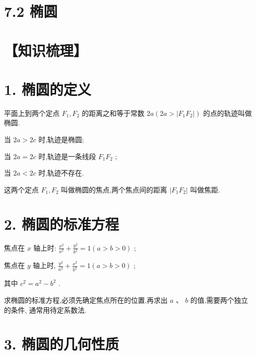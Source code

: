 \documentclass[10pt]{article}
\begin{document}
\section*{7.2 椭圆}

\section*{【知识梳理】}

\section*{1. 椭圆的定义}

平面上到两个定点 \({F}_{1},{F}_{2}\) 的距离之和等于常数 \({2a}\left( {{2a} > \left| {{F}_{1}{F}_{2}}\right| }\right)\) 的点的轨迹叫做椭圆.

当 \({2a} > {2c}\) 时,轨迹是椭圆;

当 \({2a} = {2c}\) 时,轨迹是一条线段 \({F}_{1}{F}_{2}\) ;

当 \({2a} < {2c}\) 时,轨迹不存在.

这两个定点 \({F}_{1},{F}_{2}\) 叫做椭圆的焦点,两个焦点间的距离 \(\left| {{F}_{1}{F}_{2}}\right|\) 叫做焦距.

\section*{2. 椭圆的标准方程}

焦点在 \(x\) 轴上时: \(\frac{{x}^{2}}{{a}^{2}} + \frac{{y}^{2}}{{b}^{2}} = 1\left( {a > b > 0}\right)\) ;

焦点在 \(y\) 轴上时, \(\frac{{y}^{2}}{{a}^{2}} + \frac{{x}^{2}}{{b}^{2}} = 1\left( {a > b > 0}\right)\) ;

其中 \({c}^{2} = {a}^{2} - {b}^{2}\) .

求椭圆的标准方程,必须先确定焦点所在的位置,再求出 \(a\text{ 、 }b\) 的值,需要两个独立的条件, 通常用待定系数法.

\section*{3. 椭圆的几何性质}
\end{document}

